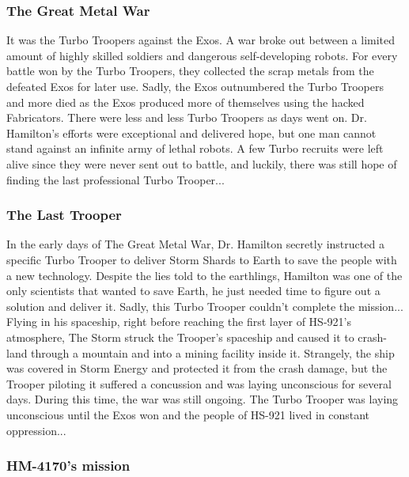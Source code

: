\documentclass[12pt]{article}
\begin{document}
\subsubsection{The Great Metal War}

It was the Turbo Troopers against the Exos. A war broke out between a limited amount of highly skilled soldiers and dangerous self-developing robots. For every battle won by the Turbo Troopers, they collected the scrap metals from the defeated Exos for later use. Sadly, the Exos outnumbered the Turbo Troopers and more died as the Exos produced more of themselves using the hacked Fabricators. There were less and less Turbo Troopers as days went on. Dr. Hamilton's efforts were exceptional and delivered hope, but one man cannot stand against an infinite army of lethal robots. A few Turbo recruits were left alive since they were never sent out to battle, and luckily, there was still hope of finding the last professional Turbo Trooper...

\subsubsection{The Last Trooper}

In the early days of The Great Metal War, Dr. Hamilton secretly instructed a specific Turbo Trooper to deliver Storm Shards to Earth to save the people with a new technology. Despite the lies told to the earthlings, Hamilton was one of the only scientists that wanted to save Earth, he just needed time to figure out a solution and deliver it. Sadly, this Turbo Trooper couldn't complete the mission... Flying in his spaceship, right before reaching the first layer of HS-921's atmosphere, The Storm struck the Trooper's spaceship and caused it to crash-land through a mountain and into a mining facility inside it. Strangely, the ship was covered in Storm Energy and protected it from the crash damage, but the Trooper piloting it suffered a concussion and was laying unconscious for several days. During this time, the war was still ongoing. The Turbo Trooper was laying unconscious until the Exos won and the people of HS-921 lived in constant oppression...

\subsubsection{HM-4170's mission}
\end{document}
